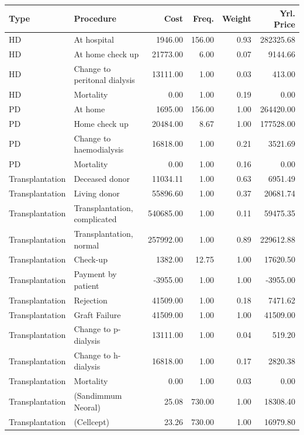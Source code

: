 \documentclass[a4paper,12pt]{article}
\begin{document}
\begin{adjustbox}{center}

	\centering
	\begin{tabular}{llrrrr}
		\hline
		Type & Procedure & Cost & Freq. & Weight & Yrl. Price \\ 
		\hline
		HD & At hospital & 1946.00 & 156.00 & 0.93 & 282325.68 \\ 
		HD & At home check up & 21773.00 & 6.00 & 0.07 & 9144.66 \\ 
		HD & Change to peritonal dialysis & 13111.00 & 1.00 & 0.03 & 413.00 \\ 
		HD & Mortality & 0.00 & 1.00 & 0.19 & 0.00 \\ 
		PD & At home  & 1695.00 & 156.00 & 1.00 & 264420.00 \\ 
		PD & Home check up & 20484.00 & 8.67 & 1.00 & 177528.00 \\ 
		PD & Change to haemodialysis & 16818.00 & 1.00 & 0.21 & 3521.69 \\ 
		PD & Mortality & 0.00 & 1.00 & 0.16 & 0.00 \\ 
		Transplantation & Deceased donor & 11034.11 & 1.00 & 0.63 & 6951.49 \\ 
		Transplantation & Living donor & 55896.60 & 1.00 & 0.37 & 20681.74 \\ 
		Transplantation & Transplantation, complicated & 540685.00 & 1.00 & 0.11 & 59475.35 \\ 
		Transplantation & Transplantation, normal & 257992.00 & 1.00 & 0.89 & 229612.88 \\ 
		Transplantation & Check-up & 1382.00 & 12.75 & 1.00 & 17620.50 \\ 
		Transplantation & Payment by patient  & -3955.00 & 1.00 & 1.00 & -3955.00 \\ 
		Transplantation & Rejection & 41509.00 & 1.00 & 0.18 & 7471.62 \\ 
		Transplantation & Graft Failure & 41509.00 & 1.00 & 1.00 & 41509.00 \\ 
		Transplantation & Change to p-dialysis & 13111.00 & 1.00 & 0.04 & 519.20 \\ 
		Transplantation & Change to h-dialysis & 16818.00 & 1.00 & 0.17 & 2820.38 \\ 
		Transplantation & Mortality & 0.00 & 1.00 & 0.03 & 0.00 \\ 
		Transplantation & (Sandimmum Neoral) & 25.08 & 730.00 & 1.00 & 18308.40 \\ 
		Transplantation & (Cellcept) & 23.26 & 730.00 & 1.00 & 16979.80 \\ 

\end{tabular}
\end{adjustbox}
\end{document}
